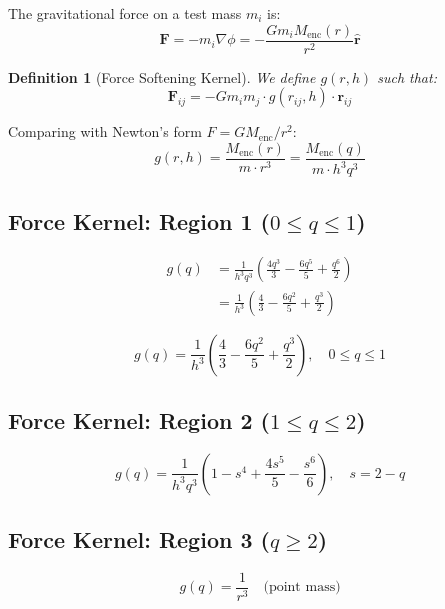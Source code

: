 \documentclass[12pt]{article}
\newtheorem{definition}{Definition}
\begin{document}
The gravitational force on a test mass $m_i$ is:
\begin{equation}
\mathbf{F} = -m_i \nabla \phi = -\frac{G m_i M_{\text{enc}}(r)}{r^2} \hat{\mathbf{r}}
\end{equation}

\begin{definition}[Force Softening Kernel]
We define $g(r, h)$ such that:
\begin{equation}
\mathbf{F}_{ij} = -G m_i m_j \cdot g(r_{ij}, h) \cdot \mathbf{r}_{ij}
\end{equation}
\end{definition}

Comparing with Newton's form $F = GM_{\text{enc}}/r^2$:
\begin{equation}
\boxed{g(r, h) = \frac{M_{\text{enc}}(r)}{m \cdot r^3} = \frac{M_{\text{enc}}(q)}{m \cdot h^3 q^3}}
\end{equation}

\subsection{Force Kernel: Region 1 ($0 \leq q \leq 1$)}
\begin{align}
g(q) &= \frac{1}{h^3 q^3} \left(\frac{4q^3}{3} - \frac{6q^5}{5} + \frac{q^6}{2}\right) \\
&= \frac{1}{h^3} \left(\frac{4}{3} - \frac{6q^2}{5} + \frac{q^3}{2}\right)
\end{align}

\begin{equation}
\boxed{g(q) = \frac{1}{h^3}\left(\frac{4}{3} - \frac{6q^2}{5} + \frac{q^3}{2}\right), \quad 0 \leq q \leq 1}
\end{equation}

\subsection{Force Kernel: Region 2 ($1 \leq q \leq 2$)}
\begin{equation}
\boxed{g(q) = \frac{1}{h^3 q^3}\left(1 - s^4 + \frac{4s^5}{5} - \frac{s^6}{6}\right), \quad s = 2-q}
\end{equation}

\subsection{Force Kernel: Region 3 ($q \geq 2$)}
\begin{equation}
\boxed{g(q) = \frac{1}{r^3} \quad \text{(point mass)}}
\end{equation}
\end{document}
